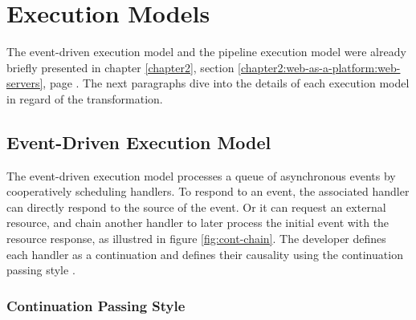 \section{Execution Models} \label{chapter4:execution-models}

The event-driven execution model and the pipeline execution model were already briefly presented in chapter \ref{chapter2}, section \ref{chapter2:web-as-a-platform:web-servers}, page \pageref{chapter2:web-as-a-platform:web-servers}.
The next paragraphs dive into the details of each execution model in regard of the transformation.

\subsection{Event-Driven Execution Model} \label{chapter4:event-driven}

The event-driven execution model processes a queue of asynchronous events by cooperatively scheduling handlers.
To respond to an event, the associated handler can directly respond to the source of the event.
Or it can request an external resource, and chain another handler to later process the initial event with the resource response, as illustred in figure \ref{fig:cont-chain}.
The developer defines each handler as a continuation and defines their causality using the continuation passing style \cite{Wand1980,Haynes1984}.



\subsubsection{Continuation Passing Style} \label{chapter4:event-loop:continuation}



